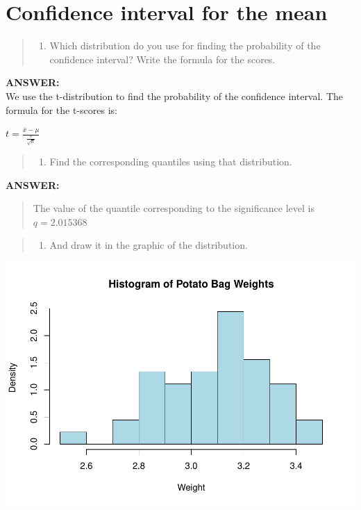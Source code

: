 \documentclass[
]{article}
\providecommand{\tightlist}{%
  \setlength{\itemsep}{0pt}\setlength{\parskip}{0pt}}
\begin{document}
\newpage

\hypertarget{confidence-interval-for-the-mean}{%
\section{Confidence interval for the
mean}\label{confidence-interval-for-the-mean}}

\begin{quote}
\begin{enumerate}
\def\labelenumi{\arabic{enumi}.}
\tightlist
\item
  Which distribution do you use for finding the probability of the
  confidence interval? Write the formula for the scores.
\end{enumerate}
\end{quote}

\textbf{ANSWER:}\\
\vspace{2cm} We use the t-distribution to find the probability of the
confidence interval. The formula for the t-scores is:

\(t = \frac{\bar{x}-\mu}{\frac{s}{\sqrt{n}}}\)

\begin{quote}
\begin{enumerate}
\def\labelenumi{\arabic{enumi}.}
\setcounter{enumi}{1}
\tightlist
\item
  Find the corresponding quantiles using that distribution.
\end{enumerate}
\end{quote}

\textbf{ANSWER:} \vspace{2cm}

\begin{quote}
The value of the quantile corresponding to the significance level is
\(q =2.015368\)
\end{quote}

\begin{quote}
\begin{enumerate}
\def\labelenumi{\arabic{enumi}.}
\setcounter{enumi}{2}
\tightlist
\item
  And draw it in the graphic of the distribution.
\end{enumerate}
\end{quote}

\includegraphics{final_work_stu_files/figure-latex/unnamed-chunk-7-1.pdf}
\end{document}
